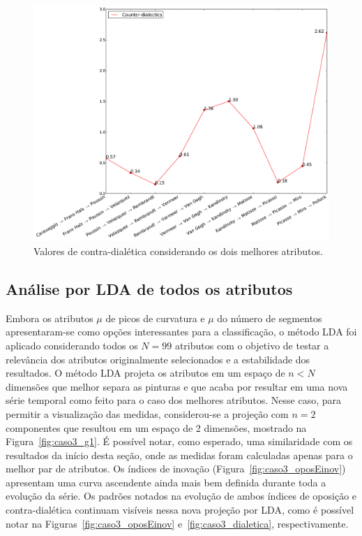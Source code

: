 \begin{figure}[h!]
\begin{center}
        \includegraphics[width=\columnwidth]{figs/caso1_dialetica}
    \caption{Valores de contra-dialética considerando os dois melhores atributos.}
        \label{fig:caso1_dialetica}
\end{center}
\end{figure}

\subsection{Análise por LDA de todos os atributos}
\label{subsec:lda}

Embora os atributos $\mu$ de picos de curvatura e $\mu$
do número de segmentos apresentaram-se como opções interessantes para a
classificação, o método LDA foi aplicado considerando todos os $N = 99$
atributos com o objetivo de testar a relevância dos atributos originalmente
selecionados e a estabilidade dos resultados. O método LDA projeta os atributos
em um espaço de $n < N$ dimensões que melhor separa as pinturas e que acaba por
resultar em uma nova série temporal como feito para o caso dos melhores
atributos. Nesse caso, para permitir a visualização das medidas, considerou-se a
projeção com $n = 2$ componentes que resultou em um espaço de 2 dimensões,
mostrado na Figura~\ref{fig:caso3_g1}. É possível notar, como esperado, uma
similaridade com os resultados da início desta seção, onde as medidas foram
calculadas apenas para o melhor par de atributos. Os índices de
inovação (Figura~\ref{fig:caso3_oposEinov}) apresentam uma curva ascendente ainda mais bem definida durante toda a
evolução da série. Os padrões notados na evolução de ambos índices de oposição e
contra-dialética continuam visíveis nessa nova projeção por LDA, como é possível
notar na Figuras~\ref{fig:caso3_oposEinov} e~\ref{fig:caso3_dialetica}, respectivamente.

